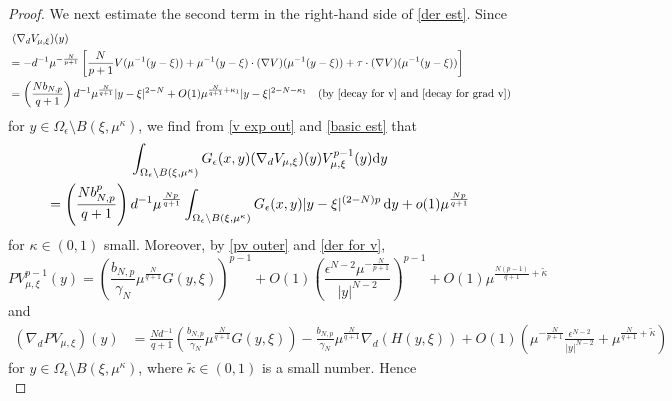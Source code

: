 \documentclass[reqno]{amsart}
\theoremstyle{remark}
\newcommand{\ep}{\epsilon}
\newcommand{\ga}{\gamma}
\newcommand{\dy}{\textup{d}y}
\newcommand{\mx}{{\mu,\xi}}
\renewcommand{\(}{\left(}
\renewcommand{\)}{\right)}
\numberwithin{equation}{section}
\begin{document}
\begin{proof}
We next estimate the second term in the right-hand side of \eqref{der est}. Since
\begin{equation}\label{der for v}
\begin{aligned}
&\ (\nabla_d V_\mx)(y) \\
&= -d^{-1}\mu^{-\frac{N}{p+1}} \left[\frac{N}{p+1}V(\mu^{-1}(y-\xi)) + \mu^{-1}(y-\xi) \cdot (\nabla V)(\mu^{-1}(y-\xi)) +\tau \cdot (\nabla V)(\mu^{-1}(y-\xi))\right] \\
&= \(\frac{Nb_{N,p}}{q+1}\)d^{-1}\mu^{\frac{N}{q+1}} |y-\xi|^{2-N}+O(1)\mu^{\frac{N}{q+1}+\kappa_1}|y-\xi|^{2-N-\kappa_1} \quad (\textup{by } \eqref{decay for v} \textup{ and } \eqref{decay for grad v})
\end{aligned}
\end{equation}
for $y \in \Omega_\ep \setminus B(\xi,\mu^\kappa)$, we find from \eqref{v exp out} and \eqref{basic est} that
\begin{multline}\label{der outer1}
\int_{\Omega_\ep \setminus B(\xi,\mu^\kappa)} G_\ep(x,y)(\nabla_d V_\mx)(y) V_\mx^{p-1}(y)\dy \\
= \(\frac{Nb_{N,p}^p}{q+1}\) d^{-1}\mu^{\frac{Np}{q+1}} \int_{\Omega_\ep \setminus B(\xi,\mu^\kappa)} G_\ep(x,y) |y-\xi|^{(2-N)p}\, \dy + o(1)\mu^{\frac{Np}{q+1}}
\end{multline}
for $\kappa \in (0,1)$ small. Moreover, by \eqref{pv outer} and \eqref{der for v},
\[PV_\mx^{p-1}(y) =\(\frac{b_{N,p}}{\ga_N}\mu^{\frac{N}{q+1}}G(y,\xi)\)^{p-1}+O(1) \(\frac{\ep^{N-2}\mu^{-\frac{N}{p+1}}}{|y|^{N-2}}\)^{p-1} + O(1)\mu^{\frac{N(p-1)}{q+1}+\tilde{\kappa}}\]
and
\begin{align*}
(\nabla_d PV_\mx)(y) &= \frac{Nd^{-1}}{q+1} \(\frac{b_{N,p}}{\ga_N} \mu^{\frac{N}{q+1}}G(y,\xi)\) - \frac{b_{N,p}}{\ga_N} \mu^{\frac{N}{q+1}} \nabla_d (H(y,\xi))
+ O(1) \(\mu^{-\frac{N}{p+1}} \frac{\ep^{N-2}}{|y|^{N-2}} + \mu^{\frac{N}{q+1}+\tilde{\kappa}}\)
\end{align*}
for $y \in \Omega_\ep \setminus B(\xi,\mu^\kappa)$, where $\tilde{\kappa} \in (0,1)$ is a small number. Hence
\begin{equation}\label{der outer2}

\end{equation}
\end{proof}
\end{document}
